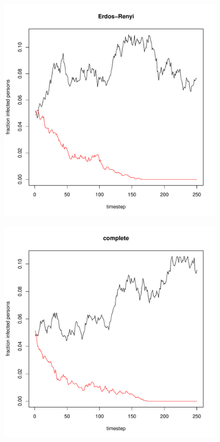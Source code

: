 \documentclass[paper=a4, fontsize=11pt]{scrartcl} %
\begin{document}
\begin{figure}[htbp] %
   \centering
   \includegraphics[width=\textwidth]{thresholdSimulation_Erdos-Renyi} 
   \label{erdosRenyi}
\end{figure}
\begin{figure}[htbp] %
   \centering
   \includegraphics[width=\textwidth]{thresholdSimulation_complete} 
   \label{complete}
\end{figure}
\end{document}
